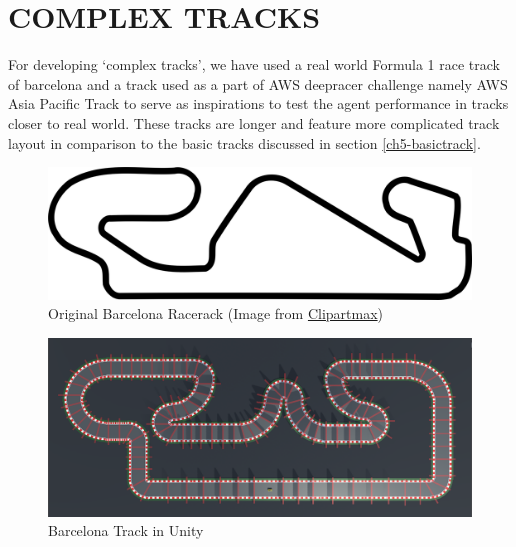 \section{COMPLEX TRACKS}
For developing `complex tracks', we have used a real world Formula 1 race track of barcelona and a track used as a part of AWS deepracer challenge namely AWS Asia Pacific Track to serve as inspirations to test the agent performance in tracks closer to real world. These tracks are longer and feature more complicated track layout in  comparison to the basic tracks discussed in section \ref{ch5-basictrack}.
\begin{figure}[H]
    \centering
    \includegraphics[width=1.0\textwidth]{images/tracks/BarcelonaOG.png}
    \caption{Original Barcelona Racerack (Image from \href{https://www.clipartmax.com/download/m2H7G6d3Z5A0G6d3_circuit-de-barcelona-catalunya-el-circuit-restaurant-barcelona-f1-circuit-map/}{Clipartmax})}
    \label{fig:barcelona}
\end{figure}


\begin{figure}[H]
    \centering
    \includegraphics[width=1.0\textwidth]{images/tracks/Barcelona.png}
    \caption{Barcelona Track in Unity}
    \label{fig:barcelona}
\end{figure}


